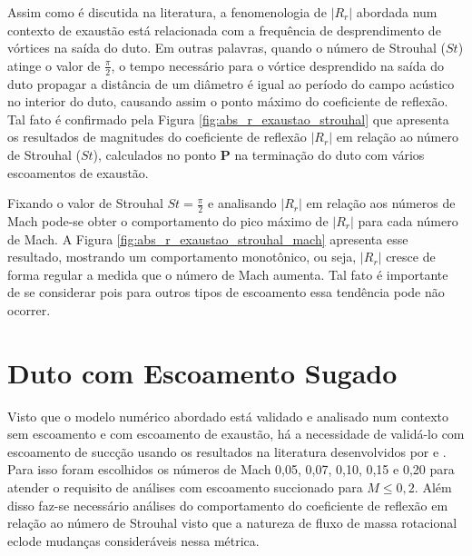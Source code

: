 Assim como é discutida na literatura, a fenomenologia de $|R_{r}|$ abordada num contexto de exaustão está relacionada com  a frequência de desprendimento de vórtices na saída do duto. Em outras palavras, quando o número de Strouhal ($St$) atinge o valor de $\frac{\pi}{2}$, o tempo necessário para o vórtice desprendido na saída do duto propagar a distância de um diâmetro é igual ao período do campo acústico no interior do duto, causando assim o ponto máximo do coeficiente de reflexão. Tal fato é confirmado pela Figura \ref{fig:abs_r_exaustao_strouhal} que apresenta os resultados de magnitudes do coeficiente de reflexão $|R_{r}|$ em relação ao número de Strouhal ($St$), calculados no ponto $\textbf{P}$ na terminação do duto com vários escoamentos de exaustão.

Fixando o valor de Strouhal $St = \frac{\pi}{2}$ e analisando $|R_{r}|$ em relação aos números de Mach pode-se obter o comportamento do pico máximo de $|R_{r}|$ para cada número de Mach. A Figura \ref{fig:abs_r_exaustao_strouhal_mach} apresenta esse resultado, mostrando um comportamento monotônico, ou seja, $|R_{r}|$ cresce de forma regular a medida que o número de Mach aumenta. Tal fato é importante de se considerar pois para outros tipos de escoamento essa tendência pode não ocorrer.  

\newpage
\begin{figure}[ht!]
\centering
  
\end{figure}

\begin{figure}[ht!]
\centering
  
\end{figure}

\newpage
\section{Duto com Escoamento Sugado}

Visto que o modelo numérico abordado está validado e analisado num contexto sem escoamento e com escoamento de exaustão, há a necessidade de validá-lo com escoamento de succção usando os resultados na literatura desenvolvidos por  e . Para isso foram escolhidos os números de Mach 0,05, 0,07, 0,10, 0,15 e 0,20 para atender o requisito de  análises com escoamento succionado para $M \leq 0,2$. Além disso faz-se necessário análises do comportamento do coeficiente de reflexão em relação ao número de Strouhal visto que a natureza de fluxo de massa rotacional eclode mudanças consideráveis nessa métrica.

